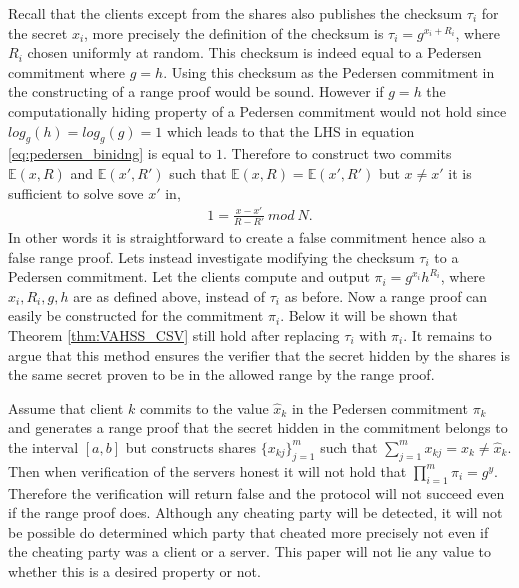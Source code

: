 Recall that the clients except from the shares also publishes the checksum $\tau_i$ for the secret $x_i$, more precisely the definition of the checksum is  $\tau_i=g^{x_i+R_i}$, where $R_i$ chosen uniformly at random. This checksum is indeed equal to a Pedersen commitment where $g=h$. Using this checksum as the Pedersen commitment in the constructing of a range proof would be sound. However if $g=h$ the computationally hiding property of a Pedersen commitment would not hold since $log_g(h)=log_g(g)=1$ which leads to that the LHS in equation \eqref{eq:pedersen_binidng} is equal to $1$. Therefore to construct two commits $\mathds{E}(x,R)$ and $\mathds{E}(x',R')$ such that $\mathds{E}(x,R) = \mathds{E}(x',R')$ but $x\neq x'$ it is sufficient to solve sove $x'$ in, 
\begin{align*}
1 = \frac{x-x'}{R-R'}\:mod \:N.
\end{align*}
In other words it is straightforward to create a false commitment hence also a false range proof. Lets instead investigate modifying the checksum $\tau_i$ to a Pedersen commitment. Let the clients compute and output $\pi_i=g^{x_i}h^{R_i}$, where $x_i,R_i,g,h$ are as defined above, instead of $\tau_i$ as before.  Now a range proof can easily be constructed for the commitment $\pi_i$. Below it will be shown that Theorem \ref{thm:VAHSS_CSV} still hold after replacing $\tau_i$ with $\pi_i$. It remains to argue that this method ensures the verifier that the secret hidden by the shares is the same secret proven to be in the allowed range by the range proof. 

Assume that client $k$ commits to the value $\hat{x}_k$ in the Pedersen commitment $\pi_k$ and generates a range proof that the secret hidden in the commitment belongs to the interval $[a,b]$ but constructs shares $\{x_{kj}\}_{j=1}^m$ such that $\sum_{j=1}^m x_{kj} = x_k \neq \hat{x}_k$. Then when verification of the servers honest it will not hold that $\prod_{i=1}^m \pi_i = g^y$. Therefore the verification will return false and the protocol will not succeed even if the range proof does. Although any cheating party will be detected, it will not be possible do determined which party that cheated more precisely not even if the cheating party was a client or a server. This paper will not lie any value to whether this is a desired property or not. 

